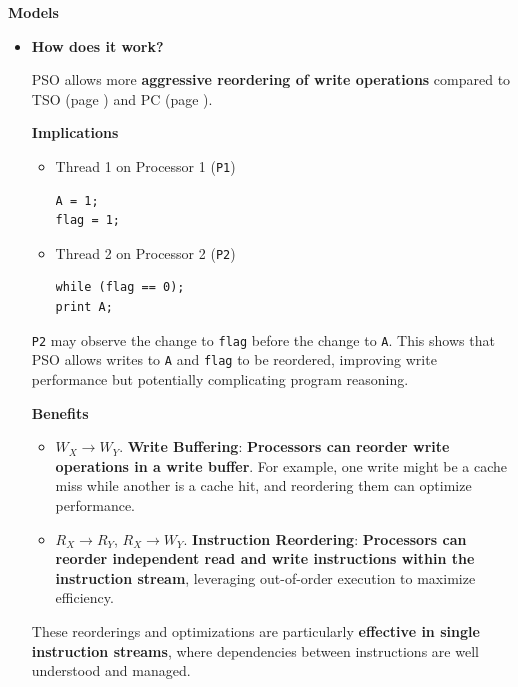 \highspace
\begin{flushleft}
    \textcolor{Green3}{ \textbf{Models}}
\end{flushleft}
\begin{itemize}
    \item {}
    \begin{flushleft}
        \textcolor{Green3}{ \textbf{How does it work?}}
    \end{flushleft}
    PSO allows more \textbf{aggressive reordering of write operations} compared to TSO (page ) and PC (page ).

    \begin{flushleft}
        \textcolor{Red2}{ \textbf{Implications}}
    \end{flushleft}
    \begin{itemize}
        \item Thread 1 on Processor 1 (\texttt{P1})
        \begin{lstlisting}
A = 1;
flag = 1;\end{lstlisting}

        \item Thread 2 on Processor 2 (\texttt{P2})
        \begin{lstlisting}
while (flag == 0); 
print A;\end{lstlisting}
    \end{itemize}

    \texttt{P2} may observe the change to \texttt{flag} before the change to \texttt{A}. This shows that PSO allows writes to \texttt{A} and \texttt{flag} to be reordered, improving write performance but potentially complicating program reasoning.

    \newpage

    \begin{flushleft}
        \textcolor{Green3}{ \textbf{Benefits}}
    \end{flushleft}
    \begin{itemize}
        \item $W_{X} \rightarrow W_{Y}$. \textcolor{Green3}{\textbf{Write Buffering}}: \textbf{Processors can reorder write operations in a write buffer}. For example, one write might be a cache miss while another is a cache hit, and reordering them can optimize performance.
        
        \item  $R_{X} \rightarrow R_{Y}$, $R_{X} \rightarrow W_{Y}$. \textcolor{Green3}{\textbf{Instruction Reordering}}: \textbf{Processors can reorder independent read and write instructions within the instruction stream}, leveraging out-of-order execution to maximize efficiency.
    \end{itemize}
    These reorderings and optimizations are particularly \textbf{effective in single instruction streams}, where dependencies between instructions are well understood and managed.
\end{itemize}

